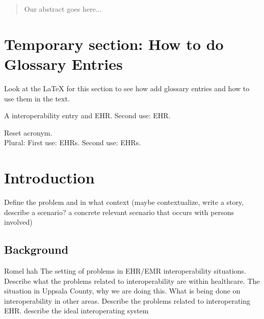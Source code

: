 \documentclass[12pt]{article}
\begin{document}
\nocite{Sh:1}



\tableofcontents
\newpage

\begin{abstract}
Our abstract goes here... 
\end{abstract}


\newpage

\printglossaries

\section*{Temporary section: How to do Glossary Entries}

Look at the {\LaTeX} for this section to see how add glossary entries and how to use them in the text.



A \gls{interoperability} entry and \gls{EHR}. Second use: \gls{EHR}.

Reset acronym. \\
Plural: First use: \glspl{EHR}. Second use: \glspl{EHR}.

\newpage

\section{Introduction}
Define the problem and in what context (maybe contextualize, write a story, describe a scenario? a concrete relevant scenario that occurs with persons involved)


\subsection{Background}

Romel hah The setting of problems in EHR/EMR interoperability situations. Describe what the problems related to interoperability are within healthcare. The situation in Uppsala County, why we are doing this. What is being done on interoperability in other areas. Describe the problems related to interoperating EHR.
describe the ideal interoperating system
\end{document}
